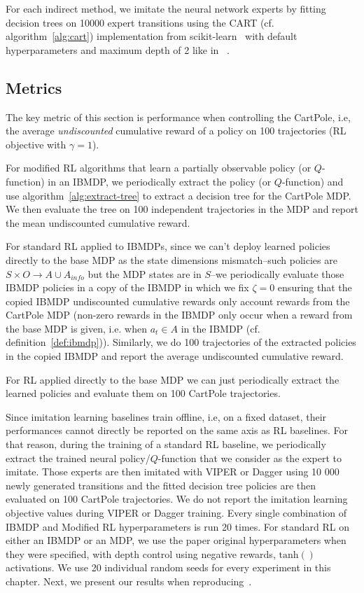 For each indirect method, we imitate the neural network experts by fitting decision trees on 10000 expert transitions using the CART (cf. algorithm~\ref{alg:cart}) implementation from scikit-learn~\cite{scikit-learn} with default hyperparameters and maximum depth of 2 like in ~\cite{topin2021iterative}.
    
\subsection{Metrics}
The key metric of this section is performance when controlling the CartPole, i.e, the average \textit{undiscounted} cumulative reward of a policy on 100 trajectories (RL objective with $\gamma=1$).

For modified RL algorithms that learn a partially observable policy (or $Q$-function) in an IBMDP, we periodically extract the policy (or $Q$-function) and use algorithm~\ref{alg:extract-tree} to extract a decision tree for the CartPole MDP. 
We then evaluate the tree on 100 independent trajectories in the MDP and report the mean undiscounted cumulative reward.

For standard RL applied to IBMDPs, since we can't deploy learned policies directly to the base MDP as the state dimensions mismatch--such policies are $S\times O\rightarrow A \cup A_{info}$ but the MDP states are in $S$--we periodically evaluate those IBMDP policies in a copy of the IBMDP in which we fix $\zeta=0$ ensuring that the copied IBMDP undiscounted cumulative rewards only account rewards from the CartPole MDP (non-zero rewards in the IBMDP only occur when a reward from the base MDP is given, i.e. when $a_t\in A$ in the IBMDP (cf. definition~\ref{def:ibmdp})).
Similarly, we do 100 trajectories of the extracted policies in the copied IBMDP and report the average undiscounted cumulative reward.

For RL applied directly to the base MDP we can just periodically extract the learned policies and evaluate them on 100 CartPole trajectories.

Since imitation learning baselines train offline, i.e, on a fixed dataset, their performances cannot directly be reported on the same axis as RL baselines.
For that reason, during the training of a standard RL baseline, we periodically extract the trained neural policy/$Q$-function that we consider as the expert to imitate.
Those experts are then imitated with VIPER or Dagger using 10 000 newly generated transitions and the fitted decision tree policies are then evaluated on 100 CartPole trajectories.
We do not report the imitation learning objective values during VIPER or Dagger training.
Every single combination of IBMDP and Modified RL hyperparameters is run 20 times.
For standard RL on either an IBMDP or an MDP, we use the paper original hyperparameters when they were specified, with depth control using negative rewards, $\operatorname{tanh()}$ activations.
We use 20 individual random seeds for every experiment in this chapter.
Next, we present our results when reproducing~\cite[table 1]{topin2021iterative}.

